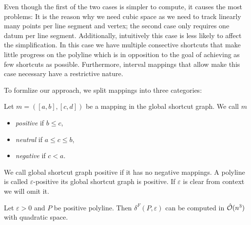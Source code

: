Even though the first of the two cases is simpler to compute, it causes the most problems: It is the reason why we need cubic space as we need to track linearly many points per line segment and vertex; the second case only requires one datum per line segment. Additionally, intuitively this case is less likely to affect the simplification. In this case we have multiple consective shortcuts that make little progress on the polyline which is in opposition to the goal of achieving as few shortcuts as possible. Furthermore, interval mappings that allow make this case necessary have a restrictive nature. 

To formlize our approach, we split mappings into three categories:
\begin{definition}
	Let \(m = ([a, b], [c, d])\) be a mapping in the global shortcut graph. We call \(m\)
	\begin{itemize}
		\item \emph{positive} if \(b \leq c\),
		\item \emph{neutral} if \(a \leq c \leq b\),
		\item \emph{negative} if \(c < a\).
	\end{itemize}

	We call global shortcut graph positive if it has no negative mappings. A polyline is called \(\varepsilon\)-positive its global shortcut graph is positive. If \(\varepsilon\) is clear from context we will omit it.
\end{definition}

\begin{theorem}
	Let \(\varepsilon > 0\) and \(P\) be positive polyline. Then \(\delta^F(P, \varepsilon)\) can be computed in \(\hat{\mathcal{O}}(n^3)\) with quadratic space.
\end{theorem}

